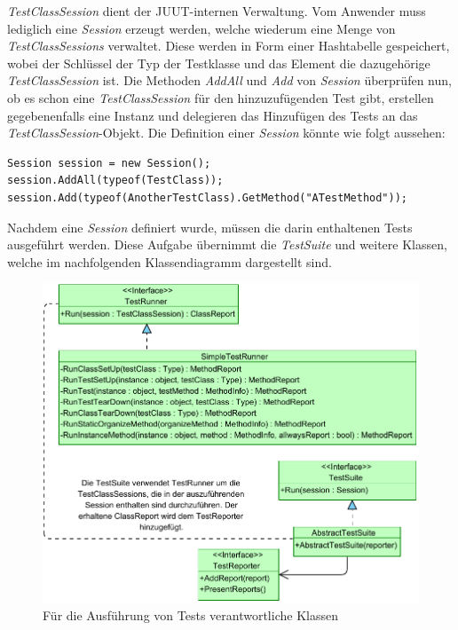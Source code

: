 \textit{TestClassSession} dient der JUUT-internen Verwaltung. Vom Anwender muss lediglich eine \textit{Session} erzeugt werden, welche wiederum eine Menge von \textit{TestClassSessions} verwaltet. Diese werden in Form einer Hashtabelle gespeichert, wobei der Schlüssel der Typ der Testklasse und das Element die dazugehörige \textit{TestClassSession} ist. Die Methoden \textit{AddAll} und \textit{Add} von \textit{Session} überprüfen nun, ob es schon eine \textit{TestClassSession} für den hinzuzufügenden Test gibt, erstellen gegebenenfalls eine Instanz und delegieren das Hinzufügen des Tests an das \textit{TestClassSession}-Objekt. Die Definition einer \textit{Session} könnte wie folgt aussehen:
\begin{lstlisting}[caption={[Beispiel für die Definition einer \textit{Session}]Beispiel für die Definition einer \textit{Session}}, label=code:Example_SessionCreation]
Session session = new Session();
session.AddAll(typeof(TestClass));
session.Add(typeof(AnotherTestClass).GetMethod("ATestMethod"));
\end{lstlisting}

Nachdem eine \textit{Session} definiert wurde, müssen die darin enthaltenen Tests ausgeführt werden. Diese Aufgabe übernimmt die \textit{TestSuite} und weitere Klassen, welche im nachfolgenden Klassendiagramm dargestellt sind.

\begin{figure}[h]
\centering
\includegraphics[width=0.8\linewidth]{images/Kapitel_Ergebnis/SuitesAndRunners}
\caption[Für die Ausführung von Tests verantwortliche Klassen]{Für die Ausführung von Tests verantwortliche Klassen}
\label{fig:SuitesAndRunners}
\end{figure}

